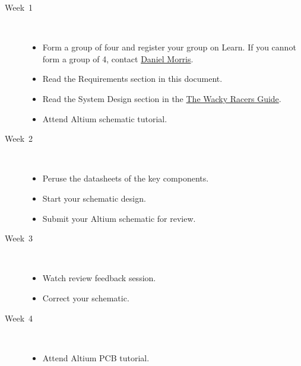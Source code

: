 \documentclass[11pt, a4paper]{article}
\makeatletter
\newcommand{\daniel}{\href{mailto:daniel.morris@pg.canterbury.ac.nz}{Daniel Morris}}
\newcommand{\theguide}{\href{https://eng-git.canterbury.ac.nz/wacky-racers/wacky-racers/-/blob/master/doc/guide/guide.pdf}{The Wacky Racers Guide}}
\makeatother
\begin{document}
\begin{description}
\item [Week~1]\mbox{}\\[-0.4cm]

  \begin{itemize}
  \item Form a group of four and register your group on Learn.  If you
    cannot form a group of 4, contact \daniel.

  \item Read the Requirements section in this document.

  \item Read the System Design section in the \theguide.

  \item Attend Altium schematic tutorial.

  \end{itemize}

\item [Week~2]\mbox{}\\[-0.4cm]

  \begin{itemize}
  \item Peruse the datasheets of the key components.

  \item Start your schematic design.

  \item Submit your Altium schematic for review.

  \end{itemize}

\item [Week~3]\mbox{}\\[-0.4cm]

  \begin{itemize}
  \item Watch review feedback session.

  \item Correct your schematic.

  \end{itemize}

\item [Week~4]\mbox{}\\[-0.4cm]

  \begin{itemize}
  \item Attend Altium PCB tutorial.


\end{itemize}
\end{description}
\end{document}
